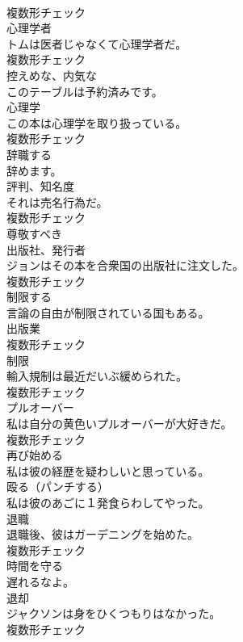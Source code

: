 \documentclass[8pt]{extreport}
\begin{document}
\begin{CJK}{UTF8}{min}
\\	複数形チェック
\\	[名詞]	心理学者	
\\	トムは医者じゃなくて心理学者だ。	
\\	複数形チェック
\\	[形容詞]	控えめな、内気な	
\\	このテーブルは予約済みです。	
\\	[名詞]	心理学	
\\	この本は心理学を取り扱っている。	
\\	複数形チェック
\\	[動詞]	辞職する	
\\	辞めます。	
\\	[名詞]	評判、知名度	
\\	それは売名行為だ。	
\\	複数形チェック
\\	[形容詞]	尊敬すべき	
\\	[名詞]	出版社、発行者	
\\	ジョンはその本を合衆国の出版社に注文した。	
\\	複数形チェック
\\	[動詞]	制限する	
\\	言論の自由が制限されている国もある。	
\\	[名詞]	出版業	
\\	複数形チェック
\\	[名詞]	制限	
\\	輸入規制は最近だいぶ緩められた。	
\\	複数形チェック
\\	[名詞]	プルオーバー	
\\	私は自分の黄色いプルオーバーが大好きだ。	
\\	複数形チェック
\\	[動詞]	再び始める	
\\	私は彼の経歴を疑わしいと思っている。	
\\	[動詞]	殴る（パンチする）	
\\	私は彼のあごに１発食らわしてやった。	
\\	[名詞]	退職	
\\	退職後、彼はガーデニングを始めた。	
\\	複数形チェック
\\	[形容詞]	時間を守る	
\\	遅れるなよ。	
\\	[名詞]	退却	
\\	ジャクソンは身をひくつもりはなかった。	
\\	複数形チェック

\end{CJK}
\end{document}
